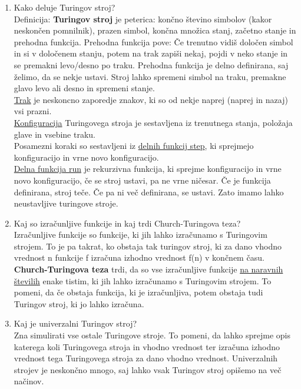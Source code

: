 \documentclass[a4paper]{article}
\begin{document}
\begin{enumerate}
        \item Kako deluje Turingov stroj?\\
        Definicija: \textbf{Turingov stroj} je peterica: končno števino simbolov (kakor neskončen pomnilnik), prazen simbol, končna množica stanj, začetno stanje in prehodna funkcija.
        Prehodna funkcija pove: Če trenutno vidiš določen simbol in si v določenem stanju, potem na trak zapiši nekaj, pojdi v neko stanje in se premakni levo/desno po traku. Prehodna funkcija je delno definirana, saj želimo, da se nekje ustavi. Stroj lahko spremeni simbol na traku, premakne glavo levo ali desno in spremeni stanje.\\
        \underline{Trak} je neskoncno zaporedje znakov, ki so od nekje naprej (naprej in nazaj) vsi prazni.\\
        \underline{Konfiguracija} Turingovega stroja je sestavljena iz trenutnega stanja, položaja glave in vsebine traku.\\
        Posamezni koraki so sestavljeni iz \underline{delnih funkcij step}, ki sprejmejo konfiguracijo in vrne novo konfiguracijo.\\
        \underline{Delna funkcija run} je rekurzivna funkcija, ki sprejme konfiguracijo in vrne novo konfiguracijo, če se stroj ustavi, pa ne vrne ničesar. Če je funkcija definirana, stroj teče. Če pa ni več definirana, se ustavi. Zato imamo lahko neustavljive turingove stroje.

        \item Kaj so izračunljive funkcije in kaj trdi Church-Turingova teza?\\ 
        Izračunljive funkcije so funkcije, ki jih lahko izračunamo s Turingovim strojem. To je pa takrat, ko obstaja tak turingov stroj, ki za dano vhodno vrednost n funkcije f izračuna izhodno vrednost f(n) v končnem času.\\
        \textbf{Church-Turingova teza} trdi, da so vse izračunljive funkcije \underline{na naravnih številih} enake tistim, ki jih lahko izračunamo s Turingovim strojem. To pomeni, da če obstaja funkcija, ki je izračunljiva, potem obstaja tudi Turingov stroj, ki jo lahko izračuna.

        \item Kaj je univerzalni Turingov stroj?\\
        Zna simulirati vse ostale Turingove stroje. To pomeni, da lahko sprejme opis katerega koli Turingovega stroja in vhodno vrednost ter izračuna izhodno vrednost tega Turingovega stroja za dano vhodno vrednost. Univerzalnih strojev je neskončno mnogo, saj lahko vsak Turingov stroj opišemo na več načinov. 


\end{enumerate}
\end{document}
